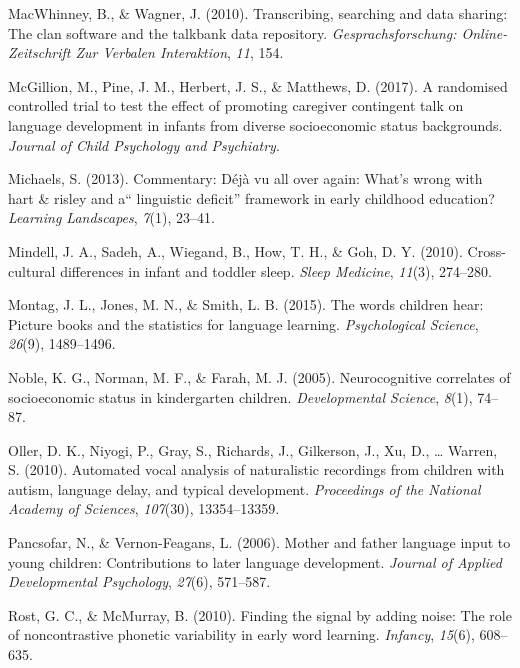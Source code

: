 \documentclass[man]{apa6}
\theoremstyle{definition}
\theoremstyle{definition}
\theoremstyle{definition}
\theoremstyle{remark}
\begin{document}
\hypertarget{ref-macwhinney2010transcribing}{}
MacWhinney, B., \& Wagner, J. (2010). Transcribing, searching and data
sharing: The clan software and the talkbank data repository.
\emph{Gesprachsforschung: Online-Zeitschrift Zur Verbalen Interaktion},
\emph{11}, 154.

\hypertarget{ref-mcgillion2017randomised}{}
McGillion, M., Pine, J. M., Herbert, J. S., \& Matthews, D. (2017). A
randomised controlled trial to test the effect of promoting caregiver
contingent talk on language development in infants from diverse
socioeconomic status backgrounds. \emph{Journal of Child Psychology and
Psychiatry}.

\hypertarget{ref-michaels2013commentary}{}
Michaels, S. (2013). Commentary: Déjà vu all over again: What's wrong
with hart \& risley and a`` linguistic deficit'' framework in early
childhood education? \emph{Learning Landscapes}, \emph{7}(1), 23--41.

\hypertarget{ref-mindell2010cross}{}
Mindell, J. A., Sadeh, A., Wiegand, B., How, T. H., \& Goh, D. Y.
(2010). Cross-cultural differences in infant and toddler sleep.
\emph{Sleep Medicine}, \emph{11}(3), 274--280.

\hypertarget{ref-montag2015words}{}
Montag, J. L., Jones, M. N., \& Smith, L. B. (2015). The words children
hear: Picture books and the statistics for language learning.
\emph{Psychological Science}, \emph{26}(9), 1489--1496.

\hypertarget{ref-noble2005neurocognitive}{}
Noble, K. G., Norman, M. F., \& Farah, M. J. (2005). Neurocognitive
correlates of socioeconomic status in kindergarten children.
\emph{Developmental Science}, \emph{8}(1), 74--87.

\hypertarget{ref-oller2010automated}{}
Oller, D. K., Niyogi, P., Gray, S., Richards, J., Gilkerson, J., Xu, D.,
\ldots{} Warren, S. (2010). Automated vocal analysis of naturalistic
recordings from children with autism, language delay, and typical
development. \emph{Proceedings of the National Academy of Sciences},
\emph{107}(30), 13354--13359.

\hypertarget{ref-pancsofar2006mother}{}
Pancsofar, N., \& Vernon-Feagans, L. (2006). Mother and father language
input to young children: Contributions to later language development.
\emph{Journal of Applied Developmental Psychology}, \emph{27}(6),
571--587.

\hypertarget{ref-rost2010finding}{}
Rost, G. C., \& McMurray, B. (2010). Finding the signal by adding noise:
The role of noncontrastive phonetic variability in early word learning.
\emph{Infancy}, \emph{15}(6), 608--635.
\end{document}
